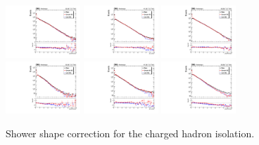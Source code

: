 \begin{figure}[htb]
	\centering
	\includegraphics[width=0.25\textwidth]{fig/ss_corr/phoPFChIso_16_EB_Z.pdf}
	\includegraphics[width=0.25\textwidth]{fig/ss_corr/ph_chIso_17_EB_Z.pdf}
	\includegraphics[width=0.25\textwidth]{fig/ss_corr/phoPFChIso_18_EB_Z.pdf}\\
	\includegraphics[width=0.25\textwidth]{fig/ss_corr/phoPFChIso_16_EE_Z.pdf}
	\includegraphics[width=0.25\textwidth]{fig/ss_corr/ph_chIso_17_EE_Z.pdf}
	\includegraphics[width=0.25\textwidth]{fig/ss_corr/phoPFChIso_18_EE_Z.pdf}\\	
	\label{fig:chiso_Z}
	\caption{Shower shape correction for the charged hadron isolation.}
\end{figure}
